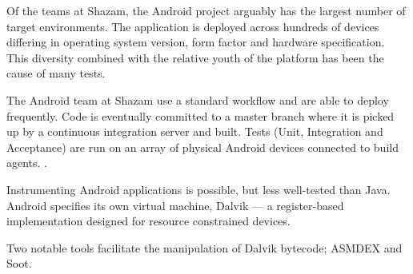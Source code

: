 Of the teams at Shazam, the Android project arguably has the largest number of target environments. The application is deployed across hundreds of devices differing in operating system version, form factor and hardware specification. This diversity combined with the relative youth of the platform has been the cause of many \flaky tests.

The Android team at Shazam use a standard workflow and are able to deploy frequently. Code is eventually committed to a master branch where it is picked up by a continuous integration server and built. Tests (Unit, Integration and Acceptance) are run on an array of physical Android devices connected to build agents. .

Instrumenting Android applications is possible, but less well-tested than Java. Android specifies its own virtual machine, Dalvik\cite{dalvik} --- a register-based implementation designed for resource constrained devices.

Two notable tools facilitate the manipulation of Dalvik bytecode; ASMDEX\cite{asmDex} and Soot\cite{vall99soot}.
